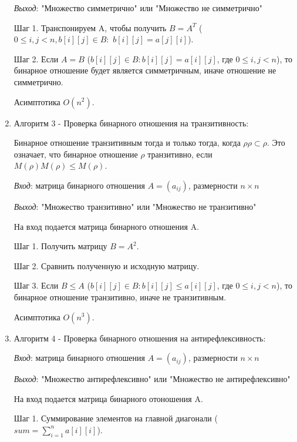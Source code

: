 \documentclass[spec, och, labwork]{shiza}
\begin{document}
\begin{enumerate}
                \textit{Выход}: "Множество симметрично" или "Множество не симметрично"

                Шаг 1. Транспонируем A, чтобы получить $B = A^T$ ($0 \leq i, j < n, b[i][j] \in B:$ $b[i][j] = a[j][i]$).

                Шаг 2. Если $A = B$ ($b[i][j] \in B: b[i][j] = a[i][j] $, где $0 \leq i, j < n$), то бинарное отношение будет является симметричным, иначе отношение не симметрично.

                Асимптотика $O(n^2)$.

                \item Алгоритм 3 - Проверка бинарного отношения на транзитивность:
                
                Бинарное отношение транзитивным тогда и только тогда, когда $\rho \rho \subset \rho$. Это означает, что бинарное
                отношение $\rho$ транзитивно, если $M(\rho)M(\rho) \leq M(\rho)$.
                
                \textit{Вход}: матрица бинарного отношения $A = (a_{ij})$, размерности $n \times n$

                \textit{Выход}: "Множество транзитивно" или "Множество не транзитивно"
                
                На вход подается матрица бинарного отношения A. 
                
                Шаг 1. Получить матрицу $B = A^2$.
                
                Шаг 2. Сравнить полученную и исходную матрицу.
                
                Шаг 3. Если $B \leq A$ ($b[i][j] \in B: b[i][j] \leq a[i][j]$, где $0 \leq i, j < n$), то бинарное отношение транзитивно, иначе не транзитивным.

                Асимптотика $O(n^3)$.

                \item Алгоритм 4 - Проверка бинарного отношения на антирефлексивность:

                \textit{Вход}: матрица бинарного отношения $A = (a_{ij})$, размерности $n \times n$

                \textit{Выход}: "Множество антирефлексивно" или "Множество не антирефлексивно"
                
                На вход подается матрица бинарного отоношения A.

                Шаг 1. Суммирование элементов на главной диагонали ($sum = \sum\limits_{i=1}^n a[i][i]$).
                

\end{enumerate}
\end{document}

